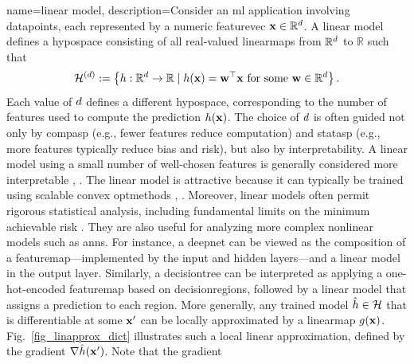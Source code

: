 {name={linear model}, 
	description={Consider an \gls{ml} application involving \glspl{datapoint}, each represented 
		by a numeric \gls{featurevec} ${\bf x} \in \mathbb{R}^{d}$. A linear \gls{model} defines 
		a \gls{hypospace} consisting of all real-valued \glspl{linearmap} from $\mathbb{R}^{d}$ to $\mathbb{R}$ such that
		\begin{equation}
			\nonumber
			\label{equ_def_lin_model_hypspace_dict}
			\mathcal{H}^{(d)} := \left\{ h: \mathbb{R}^{d} \rightarrow \mathbb{R} \mid h({\bf x}) = {\bf w}^{\top} {\bf x} \text{ for some } {\bf w} \in \mathbb{R}^{d} \right\}.
		\end{equation}
		Each value of $d$ defines a different \gls{hypospace}, corresponding to the number of 
		\glspl{feature} used to compute the \gls{prediction} $h({\bf x})$. The choice of 
		$d$ is often guided not only by \gls{compasp} (e.g., fewer features reduce computation) and 
		\gls{statasp} (e.g., more features typically reduce \gls{bias} and \gls{risk}), but also by \gls{interpretability}. 
		A linear \gls{model} using a small number of well-chosen \glspl{feature} is generally considered 
		more interpretable \cite{rudin2019stop}, \cite{Ribeiro2016}.
		The linear \gls{model} is attractive because it can typically be trained using scalable \gls{convex} 
		\glspl{optmethod} \cite{hastie01statisticallearning}, \cite{BertsekasNonLinProgr}. 
		Moreover, linear \glspl{model} often permit rigorous 
		statistical analysis, including fundamental limits on the \gls{minimum} achievable \gls{risk} \cite{Wain2019}. 
		They are also useful for analyzing more complex nonlinear \glspl{model} such as \glspl{ann}. For instance, 
		a \gls{deepnet} can be viewed as the composition of a \gls{featuremap}—implemented by the input and 
		hidden \glspl{layer}—and a linear \gls{model} in the output \gls{layer}. Similarly, a \gls{decisiontree} can be interpreted 
		as applying a one-hot-encoded \gls{featuremap} based on \glspl{decisionregion}, followed by a linear 
		\gls{model} that assigns a \gls{prediction} to each region.
		More generally, any trained \gls{model} $\hat{h} \in \mathcal{H}$ that is 
		\gls{differentiable} at some ${\bf x}'$ can be locally approximated by a \gls{linearmap} 
		$g({\bf x})$. Fig.~\ref{fig_linapprox_dict} illustrates such a local linear approximation, 
		defined by the \gls{gradient} $\nabla \hat{h}({\bf x}')$. Note that the \gls{gradient} 
}}
